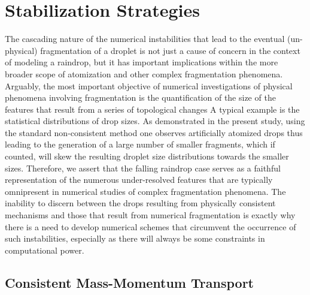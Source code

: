 \section{Stabilization Strategies}

The cascading nature of the numerical instabilities that lead to 
the eventual (un-physical) fragmentation of a droplet is not just a 
cause of concern in the context of modeling a raindrop, but it has important
implications within the more broader scope of 
atomization and other complex fragmentation phenomena. 
Arguably, the most important objective of numerical investigations of physical
phenomena involving fragmentation is the quantification of the size of 
the features that result from a series of topological changes 
A typical example is the statistical distributions of drop sizes. 
As demonstrated in the present study, using the standard non-consistent method  
one observes artificially atomized drops thus leading to the generation of a large number of 
smaller fragments, which if counted, will skew the resulting droplet size 
distributions towards the smaller sizes.
Therefore, we assert that the falling raindrop case serves as a faithful representation of the 
numerous under-resolved features that are typically omnipresent in
numerical studies of complex fragmentation phenomena.  
The inability to discern between the drops resulting from physically consistent 
mechanisms and those that result from numerical fragmentation is exactly
why there is a need to develop numerical schemes that circumvent the occurrence
of such instabilities, especially as there will always be some constraints in computational power.  


\subsection*{Consistent Mass-Momentum Transport}

